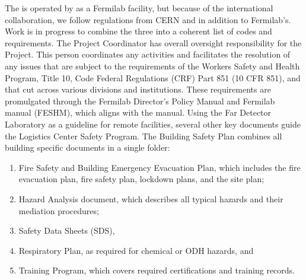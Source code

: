 The   is operated by   as a Fermilab facility, but because of the international collaboration, we  follow  regulations from CERN and  in addition to Fermilab's.  Work is in progress to combine the three into a coherent list of codes and requirements. The  Project  Coordinator has overall  oversight responsibility for the  Project.  This person coordinates any  activities and facilitates the resolution of any issues that are subject to the requirements of the  Workers Safety and Health Program, Title 10, Code Federal Regulations (CRF) Part 851 (10 CFR 851), and that cut across various divisions  and institutions. These requirements are promulgated through the Fermilab Director's Policy Manual  and Fermilab  manual (FESHM\cite{feshm}), which aligns with the   manual.  Using the  Far Detector Laboratory as a guideline for remote facilities, several other key documents guide the Logistics Center Safety Program.  The Building Safety Plan  combines all building specific documents in a single folder:

\begin{enumerate}
\item	Fire Safety and Building Emergency Evacuation Plan, which includes the fire evacuation plan, fire safety plan,  lockdown plans, and the site plan;
\item	Hazard Analysis document, which describes all typical hazards and their mediation %
procedures; 
\item	%
Safety Data Sheets (SDS), 
\item	Respiratory Plan, as required for chemical or ODH hazards, and 
\item	Training Program, which covers required certifications and  training records.
\end{enumerate}

